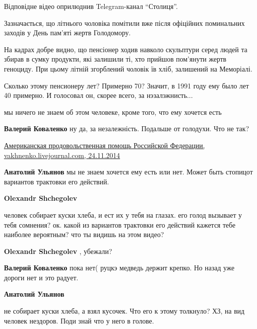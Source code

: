 \begin{itemize}
\begin{multicols}{2}
Відповідне відео оприлюднив Telegram-канал \enquote{Столиця}.

Зазначається, що літнього чоловіка помітили вже після офіційних поминальних
заходів у День пам’яті жертв Голодомору.

На кадрах добре видно, що пенсіонер ходив навколо скульптури серед людей та
збирав в сумку продукти, які залишили ті, хто прийшов пом’янути жертв геноциду.
При цьому літній згорблений чоловік їв хліб, залишений на Меморіалі.

\end{multicols}


Сколько этому пенсионеру лет? Примерно 70? Значит, в 1991 году ему было лет 40
примерно. И голосовал он, скорее всего, за нэзалэжнисть...

\begin{itemize} %
мы ничего не знаем об этом человеке, кроме того, что ему хочется есть


\textbf{Валерий Коваленко} ну да, за незалежність. Подальше от голодухи. Что не так?

\href{https://vakhnenko.livejournal.com/175302.html}{%
Американская продовольственная помощь Российской Федерации, vakhnenko.livejournal.com, 24.11.2014%
}

\textbf{Анатолий Ульянов} мы не знаем хочется ему есть или нет. Может быть стопицот вариантов трактовки его действий.

\textbf{Olexandr Shchegolev} 

человек собирает куски хлеба, и ест их у тебя на глазах. его голод вызывает у
тебя сомнения? ок. какой из вариантов трактовки его действий кажется тебе
наиболее вероятным? что ты видишь на этом видео?

\textbf{Olexandr Shchegolev} , убежали?

\textbf{Валерий Коваленко} пока нет( руцкэ медведь держит крепко. Но назад уже дороги нет и это радует.

\textbf{Анатолий Ульянов} 

не собирает куски хлеба, а взял кусочек. Что его к этому толкнуло? ХЗ, на вид
человек нездоров. Поди знай что у него в голове.

\end{itemize} %


\end{itemize}

